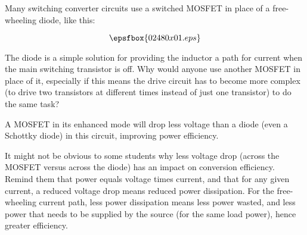 

Many switching converter circuits use a switched MOSFET in place of a free-wheeling diode, like this:

$$\epsfbox{02480x01.eps}$$

The diode is a simple solution for providing the inductor a path for current when the main switching transistor is off.  Why would anyone use another MOSFET in place of it, especially if this means the drive circuit has to become more complex (to drive two transistors at different times instead of just one transistor) to do the same task?







A MOSFET in its enhanced mode will drop less voltage than a diode (even a Schottky diode) in this circuit, improving power efficiency.







It might not be obvious to some students why less voltage drop (across the MOSFET versus across the diode) has an impact on conversion efficiency.  Remind them that power equals voltage times current, and that for any given current, a reduced voltage drop means reduced power dissipation.  For the free-wheeling current path, less power dissipation means less power wasted, and less power that needs to be supplied by the source (for the same load power), hence greater efficiency.




